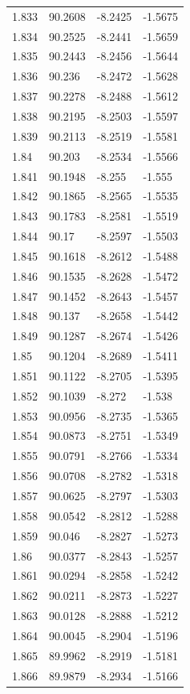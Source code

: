\begin{tabular}{llll}
1.833 & 90.2608 & -8.2425 & -1.5675 \\
1.834 & 90.2525 & -8.2441 & -1.5659 \\
1.835 & 90.2443 & -8.2456 & -1.5644 \\
1.836 & 90.236 & -8.2472 & -1.5628 \\
1.837 & 90.2278 & -8.2488 & -1.5612 \\
1.838 & 90.2195 & -8.2503 & -1.5597 \\
1.839 & 90.2113 & -8.2519 & -1.5581 \\
1.84 & 90.203 & -8.2534 & -1.5566 \\
1.841 & 90.1948 & -8.255 & -1.555 \\
1.842 & 90.1865 & -8.2565 & -1.5535 \\
1.843 & 90.1783 & -8.2581 & -1.5519 \\
1.844 & 90.17 & -8.2597 & -1.5503 \\
1.845 & 90.1618 & -8.2612 & -1.5488 \\
1.846 & 90.1535 & -8.2628 & -1.5472 \\
1.847 & 90.1452 & -8.2643 & -1.5457 \\
1.848 & 90.137 & -8.2658 & -1.5442 \\
1.849 & 90.1287 & -8.2674 & -1.5426 \\
1.85 & 90.1204 & -8.2689 & -1.5411 \\
1.851 & 90.1122 & -8.2705 & -1.5395 \\
1.852 & 90.1039 & -8.272 & -1.538 \\
1.853 & 90.0956 & -8.2735 & -1.5365 \\
1.854 & 90.0873 & -8.2751 & -1.5349 \\
1.855 & 90.0791 & -8.2766 & -1.5334 \\
1.856 & 90.0708 & -8.2782 & -1.5318 \\
1.857 & 90.0625 & -8.2797 & -1.5303 \\
1.858 & 90.0542 & -8.2812 & -1.5288 \\
1.859 & 90.046 & -8.2827 & -1.5273 \\
1.86 & 90.0377 & -8.2843 & -1.5257 \\
1.861 & 90.0294 & -8.2858 & -1.5242 \\
1.862 & 90.0211 & -8.2873 & -1.5227 \\
1.863 & 90.0128 & -8.2888 & -1.5212 \\
1.864 & 90.0045 & -8.2904 & -1.5196 \\
1.865 & 89.9962 & -8.2919 & -1.5181 \\
1.866 & 89.9879 & -8.2934 & -1.5166 \\

\end{tabular}
